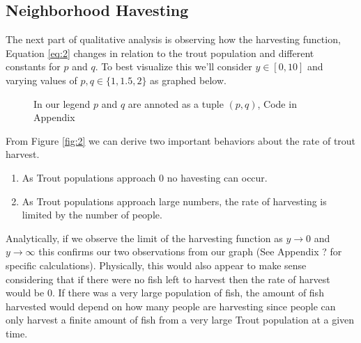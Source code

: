 \documentclass[letterpaper,12pt]{article}
\begin{document}
\subsection{Neighborhood Havesting}
The next part of qualitative analysis is observing how the harvesting function, Equation \eqref{eq:2} changes in relation to the trout population and different constants for \(p\) and \(q\).
To best visualize this we'll consider \(y \in [0,10]\) and varying values of \(p,q \in \{1, 1.5, 2\}\) as graphed below.
\newline
\begin{figure}[H]
    \centering
    
    \caption{In our legend \(p\) and \(q\) are annoted as a tuple \((p,q)\), Code in Appendix}
    \label{fig:2}
\end{figure}
From Figure \eqref{fig:2} we can derive two important behaviors about the rate of trout harvest.
\begin{enumerate}
    \item As Trout populations approach 0 no havesting can occur.
    \item As Trout populations approach large numbers, the rate of harvesting is limited by the number of people.
\end{enumerate}
Analytically, if we observe the limit of the harvesting function as \(y\to 0\) and \(y\to \infty\) this confirms our two observations from our graph (See Appendix ? for specific calculations). 
Physically, this would also appear to make sense considering that if there were no fish left to harvest then the rate of harvest would be 0. 
If there was a very large population of fish, the amount of fish harvested would depend on how many people are harvesting since people can only harvest a finite amount of fish from a very large Trout population at a given time.
\end{document}
